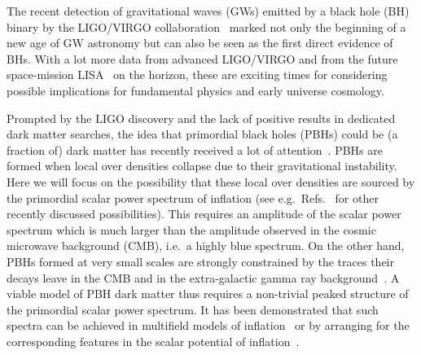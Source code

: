 The recent detection of gravitational waves (GWs) emitted by a black hole (BH) binary by the LIGO/VIRGO collaboration~\cite{Abbott:2016blz} marked not only the beginning of a new age of GW astronomy but can also be seen as the first direct evidence of BHs. With a lot more data from advanced LIGO/VIRGO and from the future space-mission LISA~\cite{LISA} on the horizon, these are exciting times for considering possible implications for fundamental physics and early universe cosmology. 

Prompted by the LIGO discovery and the lack of positive results in dedicated dark matter searches, the idea that primordial black holes (PBHs) could be (a fraction of) dark matter has recently received a lot of attention~\cite{Bird:2016dcv, Clesse:2016vqa,Sasaki:2016jop,Carr:2016drx,Clesse:2016ajp,Blinnikov:2016bxu,Garcia-Bellido:2017fdg,Georg:2017mqk}. PBHs are formed when local over densities collapse due to their gravitational instability. Here we will focus on the possibility that these local over densities are sourced by the primordial scalar power spectrum of inflation (see e.g.\ Refs.~\cite{Cotner:2016cvr,Davoudiasl:2016mwf } for other recently discussed possibilities). This requires an amplitude of the scalar power spectrum which is much larger than the amplitude observed in the cosmic microwave background (CMB), i.e.\ a highly blue spectrum. On the other hand, PBHs formed at very small scales are strongly constrained by the traces their decays leave in the CMB and in the extra-galactic gamma ray background~\cite{Carr:2009jm}. A viable model of PBH dark matter thus requires a non-trivial peaked structure of the primordial scalar power spectrum. It has been demonstrated that such spectra can be achieved in multifield models of inflation~\cite{GarciaBellido:1996qt,Lyth:2011kj,Bugaev:2011wy,Clesse:2015wea,Kohri:2012yw,Kawasaki:2012wr,Bugaev:2013vba,Inomata:2017okj,Inomata:2016rbd,Kawasaki:2016pql} or by arranging for the corresponding features in the scalar potential of inflation~\cite{Cheng:2016qzb,Garcia-Bellido:2017mdw,Garcia-Bellido:2016dkw}.

